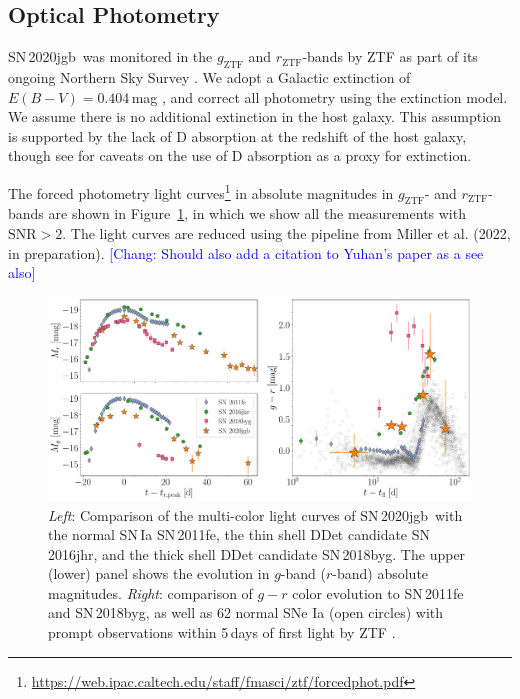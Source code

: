 \documentclass[twocolumn]{aastex631}
\newcommand{\sn}{SN\,2020jgb}
\newcommand{\chang}[1]{\textcolor{blue}{[Chang: #1]}}
\begin{document}
\subsection{Optical Photometry}
\sn\ was monitored in the $g_\mathrm{ZTF}$ and $r_\mathrm{ZTF}$-bands by ZTF as part of its ongoing Northern Sky Survey \citep{ZTF2019a}. %
We adopt a Galactic extinction of $E(B-V)=0.404\,$mag \citep{Schlafly2011}, and correct all photometry using the \citet{Fitzpatrick1999} extinction model. We assume there is no additional extinction in the host galaxy. This assumption is supported by the lack of  D absorption at the redshift of the host galaxy, though see \citet{Poznanski_2011} for caveats on the use of  D absorption as a proxy for extinction. 

The forced photometry light curves\footnote{\url{https://web.ipac.caltech.edu/staff/fmasci/ztf/forcedphot.pdf}} in absolute magnitudes in $g_\mathrm{ZTF}$- and $r_\mathrm{ZTF}$-bands are shown in Figure~\ref{fig:photometry}, in which we show all the measurements with $\mathrm{SNR}>2$. The light curves are reduced using the pipeline from Miller et al. (2022, in preparation). \chang{Should also add a citation to Yuhan's paper as a see also} %

\begin{figure}
    \centering
    \includegraphics[width=\textwidth]{photometry.pdf}
    \caption{\textit{Left}: Comparison of the multi-color light curves  of \sn\ with the normal SN\,Ia SN\,2011fe, the thin shell DDet candidate SN\,2016jhr, and the thick shell DDet candidate SN\,2018byg. The upper (lower) panel shows the evolution in $g$-band ($r$-band) absolute magnitudes. \textit{Right}: comparison of $g-r$ color evolution to SN\,2011fe and SN\,2018byg, as well as 62 normal SNe Ia (open circles) with prompt observations within 5\,days of first light by ZTF \citep{Bulla2020}.}
    \label{fig:photometry}
\end{figure}
\end{document}
